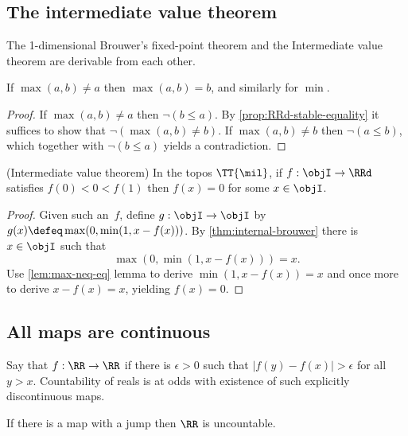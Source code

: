 \subsection{The intermediate value theorem}
\label{sec:interm-value-theor}
%
The 1-dimensional Brouwer's fixed-point theorem and the Intermediate value theorem are derivable from each other.
%

\begin{lemmaC}
  \label{lem:max-neq-eq}%
  If $\max(a, b) \neq a$ then $\max(a, b) = b$, and similarly for $\min$.
\end{lemmaC}

\begin{proof}
  If $\max(a, b) \neq a$ then $\neg (b \leq a)$.
  By \cref{prop:RRd-stable-equality} it suffices to show that $\neg (\max(a, b) \neq b)$.
  If $\max(a, b) \neq b$ then $\neg (a \leq b)$, which together with $\neg (b \leq a)$ yields a contradiction.
\end{proof}

\begin{theorem}(Intermediate value theorem)
  In the topos $\TT{\mil}$, if $f : \objI \to \RRd$ satisfies $f(0) < 0 < f(1)$ then $f(x) = 0$ for some $x \in \objI$.
\end{theorem}

\begin{proof}
  Given such an~$f$, define $g : \objI \to \objI$ by
  $g(x) \defeq \max(0, \min(1, x - f(x)))$.
  By \cref{thm:internal-brouwer} there is $x \in \objI$ such that
  \begin{equation*}
    \max(0, \min(1, x - f(x))) = x.
  \end{equation*}
  Use \cref{lem:max-neq-eq} lemma to derive $\min(1, x - f(x)) = x$ and once more to derive $x - f(x) = x$,
  yielding $f(x) = 0$.
\end{proof}

\subsection{All maps are continuous}
\label{sec:continuity-maps}
%
Say that $f : \RR \to \RR$  if there is $\epsilon > 0$ such that $|f(y) - f(x)| > \epsilon$ for all $y > x$. Countability of reals is at odds with existence of such explicitly discontinuous maps.

\begin{propositionC}
  If there is a map with a jump then $\RR$ is uncountable.
\end{propositionC}

